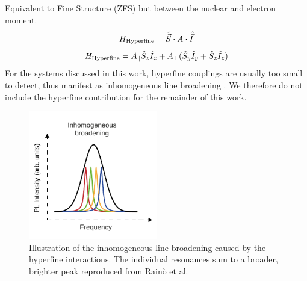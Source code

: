 \subsection{}
Equivalent to Fine Structure (ZFS) but between the nuclear and electron moment.
\begin{equation}
	H_{\ce{Hyperfine}} = \hat{\vec{S}} \cdot A \cdot \hat{\vec{I}}
	\label{eq:hyperfine_hamiltonian_dense}
\end{equation}
\begin{equation}
	H_{\ce{Hyperfine}} = A_\parallel \hat{S}_z\hat{I}_z + A_\perp(\hat{S}_y\hat{I}_y + \hat{S}_z\hat{I}_z)
	\label{eq:hyperfine_hamiltonian_componentwise}
\end{equation}
For the systems discussed in this work, hyperfine couplings are usually too small to detect,
thus manifest as inhomogeneous line broadening \cite{SpinStates}. We therefore do not include the hyperfine contribution
for the remainder of this work.
 \begin{figure}[H]
    \begin{center}
        \includegraphics[width=0.5\textwidth]{figures/inhom-broadening.pdf}
	\caption{Illustration of the inhomogeneous line broadening caused by the hyperfine interactions. The individual resonances sum to a broader, brighter peak reproduced from Rainò et al.}\label{fig:}
    \end{center}
\end{figure}



